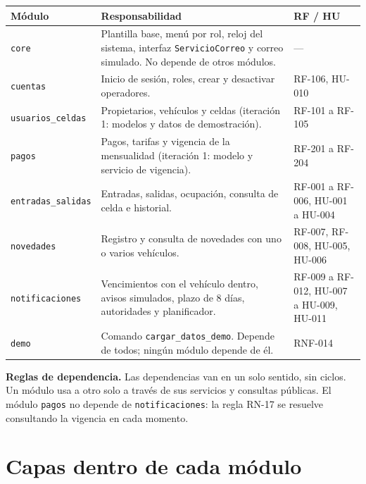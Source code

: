 \begin{longtable}{>{\raggedright\arraybackslash}p{3cm}>{\raggedright\arraybackslash}p{7cm}>{\raggedright\arraybackslash}p{4.4cm}}
\toprule
\textbf{Módulo} & \textbf{Responsabilidad} & \textbf{RF / HU}\\
\midrule\endhead
\texttt{core} & Plantilla base, menú por rol, reloj del sistema, interfaz \texttt{ServicioCorreo} y correo simulado. No depende de otros módulos. & ---\\
\texttt{cuentas} & Inicio de sesión, roles, crear y desactivar operadores. & RF-106, HU-010\\
\texttt{usuarios\_celdas} & Propietarios, vehículos y celdas (iteración 1: modelos y datos de demostración). & RF-101 a RF-105\\
\texttt{pagos} & Pagos, tarifas y vigencia de la mensualidad (iteración 1: modelo y servicio de vigencia). & RF-201 a RF-204\\
\texttt{entradas\_salidas} & Entradas, salidas, ocupación, consulta de celda e historial. & RF-001 a RF-006, HU-001 a HU-004\\
\texttt{novedades} & Registro y consulta de novedades con uno o varios vehículos. & RF-007, RF-008, HU-005, HU-006\\
\texttt{notificaciones} & Vencimientos con el vehículo dentro, avisos simulados, plazo de 8 días, autoridades y planificador. & RF-009 a RF-012, HU-007 a HU-009, HU-011\\
\texttt{demo} & Comando \texttt{cargar\_datos\_demo}. Depende de todos; ningún módulo depende de él. & RNF-014\\
\bottomrule
\end{longtable}

\textbf{Reglas de dependencia.} Las dependencias van en un solo sentido, sin ciclos. Un módulo usa a otro solo a través de sus servicios y consultas públicas. El módulo \texttt{pagos} no depende de \texttt{notificaciones}: la regla RN-17 se resuelve consultando la vigencia en cada momento.

\section{Capas dentro de cada módulo}

